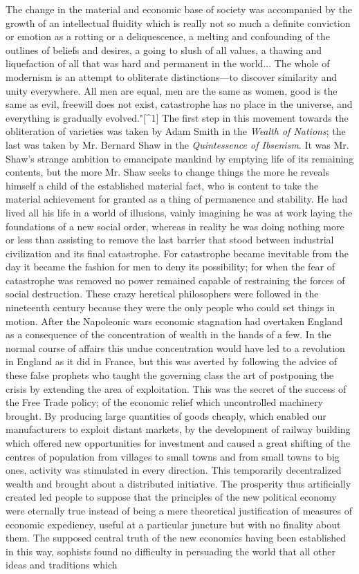 \documentclass{book}
\begin{document}
The change in the material and economic base of society was accompanied by the growth of an intellectual fluidity which is really not so much a definite conviction or emotion as a rotting or a deliquescence, a melting and confounding of the outlines of beliefs and desires, a going to slush of all values, a thawing and liquefaction of all that was hard and permanent in the world... The whole of modernism is an attempt to obliterate distinctions—to discover similarity and unity everywhere. All men are equal, men are the same as women, good is the same as evil, freewill does not exist, catastrophe has no place in the universe, and everything is gradually evolved."{[}\textasciicircum{}1{]} The first step in this movement towards the obliteration of varieties was taken by Adam Smith in the \emph{Wealth of Nations}; the last was taken by Mr. Bernard Shaw in the \emph{Quintessence of Ibsenism}. It was Mr. Shaw’s strange ambition to emancipate mankind by emptying life of its remaining contents, but the more Mr. Shaw seeks to change things the more he reveals himself a child of the established material fact, who is content to take the material achievement for granted as a thing of permanence and stability. He had lived all his life in a world of illusions, vainly imagining he was at work laying the foundations of a new social order, whereas in reality he was doing nothing more or less than assisting to remove the last barrier that stood between industrial civilization and its final catastrophe. For catastrophe became inevitable from the day it became the fashion for men to deny its possibility; for when the fear of catastrophe was removed no power remained capable of restraining the forces of social destruction. These crazy heretical philosophers were followed in the nineteenth century because they were the only people who could set things in motion. After the Napoleonic wars economic stagnation had overtaken England as a consequence of the concentration of wealth in the hands of a few. In the normal course of affairs this undue concentration would have led to a revolution in England as it did in France, but this was averted by following the advice of these false prophets who taught the governing class the art of postponing the crisis by extending the area of exploitation. This was the secret of the success of the Free Trade policy; of the economic relief which uncontrolled machinery brought. By producing large quantities of goods cheaply, which enabled our manufacturers to exploit distant markets, by the development of railway building which offered new opportunities for investment and caused a great shifting of the centres of population from villages to small towns and from small towns to big ones, activity was stimulated in every direction. This temporarily decentralized wealth and brought about a distributed initiative. The prosperity thus artificially created led people to suppose that the principles of the new political economy were eternally true instead of being a mere theoretical justification of measures of economic expediency, useful at a particular juncture but with no finality about them. The supposed central truth of the new economics having been established in this way, sophists found no difficulty in persuading the world that all other ideas and traditions which 
\end{document}
